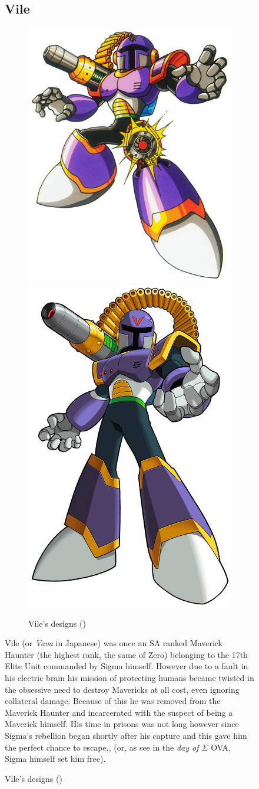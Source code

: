 \begin{figure}[htp]
\subsection{Vile}\label{boss:vile}
\begin{figure}[htp]
	\centering
	\includegraphics[width=0.4\linewidth]{figures/X1/Sigma_stages/Vile.jpg}
	\includegraphics[width=0.35\linewidth]{figures/X1/Sigma_stages/MhxVile.png}
	\caption{Vile's designs (\cite{book:MMX_Complete_art})}
\end{figure}
Vile (or \textit{Vava} in Japanese) was once an SA ranked Maverick Haunter (the highest rank, the same of Zero) belonging to the 17th Elite Unit commanded by Sigma himself. However due to a fault in his electric brain his mission of protecting humans became twisted in the obsessive need to destroy Mavericks at all cost, even ignoring collateral damage. Because of this he was removed from the Maverick Haunter and incarcerated with the suspect of being a Maverick himself. His time in prisons was not long however since Sigma's rebellion began shortly after his capture and this gave him the perfect chance to escape\cite{Xcoll1:Manual_X1},\cite{MHX:manual},\cite{wayback:X_resources} (or, as see in the \textit{day of $\Sigma$} OVA, Sigma himself set him free). 


\end{figure}
